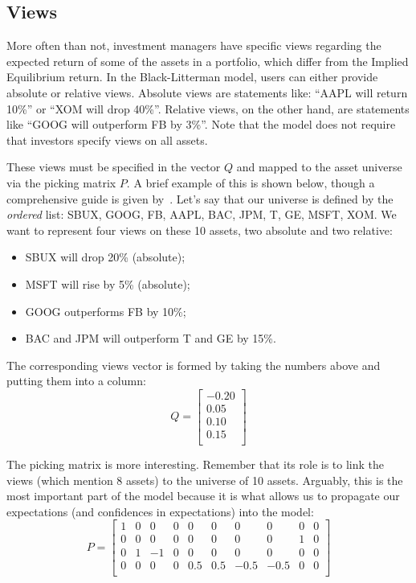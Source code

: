\subsection{Views}
More often than not, investment managers have specific views regarding the expected return of some of the assets in a portfolio, which differ from the Implied Equilibrium return.
In the Black-Litterman model, users can either provide absolute or relative views. Absolute views are statements like: “AAPL will return 10\%” or “XOM will drop 40\%”. Relative views, on the other hand, are statements like “GOOG will outperform FB by 3\%”.
Note that the model does not require that investors specify views on all assets.

These views must be specified in the vector $Q$ and mapped to the asset universe via the picking matrix $P$. A brief example of this is shown below, though a comprehensive guide is given by~\cite{bib:Idzorek}.
Let’s say that our universe is defined by the \emph{ordered} list: SBUX, GOOG, FB, AAPL, BAC, JPM, T, GE, MSFT, XOM. We want to represent four views on these 10 assets, two absolute and two relative:
\begin{itemize}
	\item SBUX will drop 20\% (absolute);
	\item MSFT will rise by 5\% (absolute);
	\item GOOG outperforms FB by 10\%;
	\item BAC and JPM will outperform T and GE by 15\%.
\end{itemize}

The corresponding views vector is formed by taking the numbers above and putting them into a column:
\begin{equation}
	Q = \begin{bmatrix}-0.20 \\ 0.05\\ 0.10\\ 0.15\\\end{bmatrix}
\end{equation}

The picking matrix is more interesting. Remember that its role is to link the views (which mention 8 assets) to the universe of 10 assets. Arguably, this is the most important part of the model because it is what allows us to propagate our expectations (and confidences in expectations) into the model:
\begin{equation}
	P = \begin{bmatrix}
		1 & 0 & 0 & 0 & 0 & 0 & 0 & 0 & 0 & 0 \\
		0 & 0 & 0 & 0 & 0 & 0 & 0 & 0 & 1 & 0 \\
		0 & 1 & -1 & 0 & 0 & 0 & 0 & 0 & 0 & 0 \\
		0 & 0 & 0 & 0 & 0.5 & 0.5 & -0.5 & -0.5 & 0 & 0 \\
	\end{bmatrix}
\end{equation}

